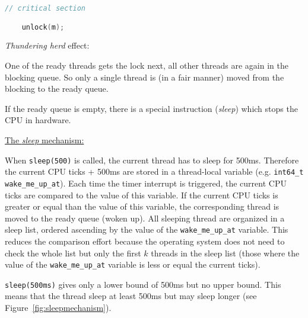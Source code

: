 {{\begin{lstlisting}[language = C, frame = none]
	// critical section

	unlock(m);
		\end{lstlisting}
	}
	\par{
		\noindent \textit{Thundering herd} effect:
		\par{
			\noindent
			One of the ready threads gets the lock next, all other threads are again in the blocking queue. So only a single thread is (in a fair manner) moved from the blocking to the ready queue.
		}
	}
	\par{
		\noindent
		If the ready queue is empty, there is a special instruction (\textit{sleep}) which stops the CPU in hardware.
	}
	\par{
		\noindent\underline{The \textit{sleep} mechanism:}
		\par{
			\noindent
			When \texttt{sleep(500)} is called, the current thread has to sleep for 500ms. Therefore the current CPU ticks + 500ms are stored in a thread-local variable (e.g. \texttt{int64\_t wake\_me\_up\_at}). Each time the timer interrupt is triggered, the current CPU ticks are compared to the value of this variable. If the current CPU ticks is greater or equal than the value of this variable, the corresponding thread is moved to the ready queue (woken up). All sleeping thread are organized in a sleep list, ordered ascending by the value of the \texttt{wake\_me\_up\_at} variable. This reduces the comparison effort because the operating system does not need to check the whole list but only the first $k$ threads in the sleep list (those where the value of the \texttt{wake\_me\_up\_at} variable is less or equal the current ticks).
		}
		\par{
			\noindent
			\texttt{sleep(500ms)} gives only a lower bound of 500ms but no upper bound. This means that the thread sleep at least 500ms but may sleep longer (see Figure~\ref{fig:sleepmechanism}).
		}
		\begin{figure}[H]
			\centering
\end{figure}}}
